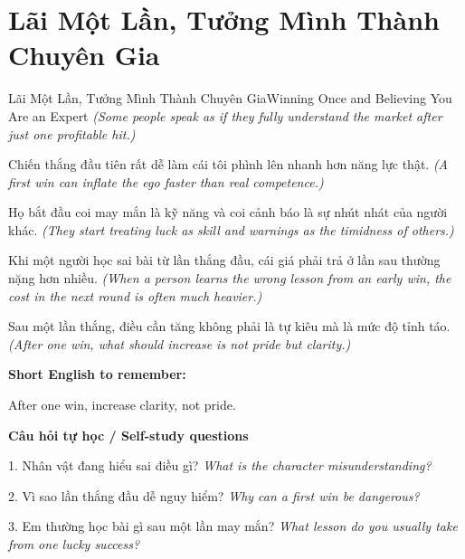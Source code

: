 \section{Lãi Một Lần, Tưởng Mình Thành Chuyên Gia}
\begin{truyen}{Lãi Một Lần, Tưởng Mình Thành Chuyên Gia}{Winning Once and Believing You Are an Expert}
\textit{(Some people speak as if they fully understand the market after just one profitable hit.)}

Chiến thắng đầu tiên rất dễ làm cái tôi phình lên nhanh hơn năng lực thật.
\textit{(A first win can inflate the ego faster than real competence.)}

Họ bắt đầu coi may mắn là kỹ năng và coi cảnh báo là sự nhút nhát của người khác.
\textit{(They start treating luck as skill and warnings as the timidness of others.)}

Khi một người học sai bài từ lần thắng đầu, cái giá phải trả ở lần sau thường nặng hơn nhiều.
\textit{(When a person learns the wrong lesson from an early win, the cost in the next round is often much heavier.)}

\end{truyen}

\begin{baihoc}
Sau một lần thắng, điều cần tăng không phải là tự kiêu mà là mức độ tỉnh táo.
\textit{(After one win, what should increase is not pride but clarity.)}
\end{baihoc}

\begin{ghinhoanh}
\textbf{Short English to remember:}

After one win, increase clarity, not pride.

\end{ghinhoanh}

\begin{tuhocnhanh}
\textbf{Câu hỏi tự học / Self-study questions}

1. Nhân vật đang hiểu sai điều gì? \textit{What is the character misunderstanding?}

2. Vì sao lần thắng đầu dễ nguy hiểm? \textit{Why can a first win be dangerous?}

3. Em thường học bài gì sau một lần may mắn? \textit{What lesson do you usually take from one lucky success?}
\end{tuhocnhanh}
\ngancach

